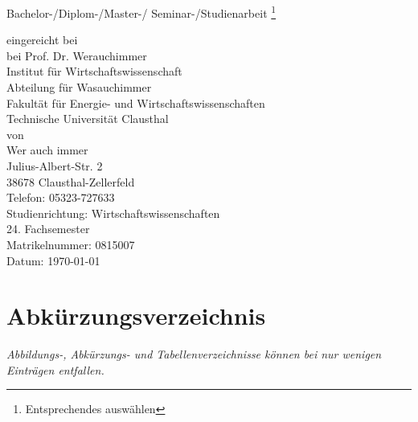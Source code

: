 \documentclass[a4paper, 12pt]{article}
\renewcommand{\baselinestretch}{1.3}
\begin{document}
\begin{titlepage}

\renewcommand{\thefootnote}{\fnsymbol{footnote}}


\begin{center}

\vspace{10ex} {\Huge Bachelor-/Diplom-/Master-/ Seminar-/Studienarbeit
\footnote{Entsprechendes ausw\"{a}hlen}}


\vspace{10ex}


  \noindent eingereicht bei \\
  \vspace{10ex}
  bei Prof. Dr. Werauchimmer\\
Institut f\"{u}r Wirtschaftswissenschaft\\
Abteilung f\"{u}r Wasauchimmer\\
Fakult\"{a}t f\"{u}r Energie- und Wirtschaftswissenschaften\\ Technische Universit\"{a}t
Clausthal\\[10ex] von \\ Wer auch immer\\
Julius-Albert-Str. 2\\
38678 Clausthal-Zellerfeld\\ Telefon: 05323-727633 \\ Studienrichtung:
Wirtschaftswissenschaften\\ 24. Fachsemester \\ Matrikelnummer: 0815007 \\[2ex]
Datum: \today

\end{center}



\end{titlepage}

\tableofcontents
\renewcommand{\baselinestretch}{1.5}
\pagebreak

\section*{Abk\"{u}rzungsverzeichnis}
\emph{Abbildungs-, Abk\"{u}rzungs- und Tabellenverzeichnisse k\"{o}nnen bei nur wenigen
Eintr\"{a}gen entfallen.} \vspace{0.5em}
%
\end{document}
